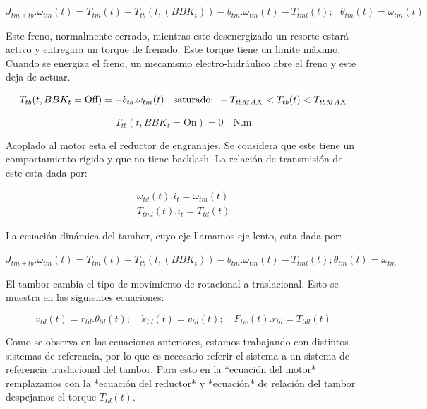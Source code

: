 \begin{equation}
    J_{tm+tb}.\dot{\omega}_{tm}(t) = T_{tm}(t) + T_{tb}(t, (BBK_t)) - b_{tm}.\omega_{tm}(t) - T_{tml}(t); \text{    } \dot{\theta}_{tm}(t) = \omega_{tm}(t)
\end{equation}

Este freno, normalmente cerrado, mientras este desenergizado un resorte 
estará activo y entregara un torque de frenado. Este torque tiene un 
limite máximo. Cuando se energiza el freno, un mecanismo electro-hidráulico
abre el freno y este deja de actuar.

\begin{equation}
    T_{tb}(t, BBK_t = \text{Off}) = -b_{tb}.\omega_{tm}(t) \text{ , saturado: } -T_{tb MAX} < T_{tb}(t) < T_{tb MAX}\\
\end{equation}

\begin{equation}
    T_{tb}(t, BBK_t = \text{On} ) = 0 \quad \text{N.m}
\end{equation}

Acoplado al motor esta el reductor de engranajes. Se considera que
este tiene un comportamiento rígido y que no tiene backlash. La relación
de transmisión de este esta dada por:

\begin{equation}
    \begin{split}
        \omega_{td}(t). i_t = \omega_{tm}(t)\\
        T_{tml}(t). i_t = T_{td}(t)
    \end{split}
\end{equation}

La ecuación dinámica del tambor, cuyo eje llamamos eje lento, esta dada por:

\begin{equation}
    J_{tm+tb}.\dot{\omega}_{tm}(t) = T_{tm}(t) + T_{tb}(t, (BBK_t)) - b_{tm}.\omega_{tm}(t) - T_{tml}(t);   \dot{\theta}_{tm}(t) = \omega_{tm}
\end{equation}

El tambor cambia el tipo de movimiento de rotacional a traslacional.
Esto se muestra en las siguientes ecuaciones:

\begin{equation}
    v_{td}(t) = r_{td}.\theta_{td}(t); \quad \dot{x}_{td}(t) = v_{td}(t) ; \quad F_{tw}(t).r_{td} = T_{tdl}(t)
\end{equation}

Como se observa en las ecuaciones anteriores, estamos trabajando con 
distintos sistemas de referencia, por lo que es necesario referir el sistema
a un sistema de referencia traslacional del tambor. Para esto en la *ecuación 
del motor* remplazamos con la *ecuación del reductor* y *ecuación* de relación
del tambor despejamos el torque $T_{td}(t)$.

